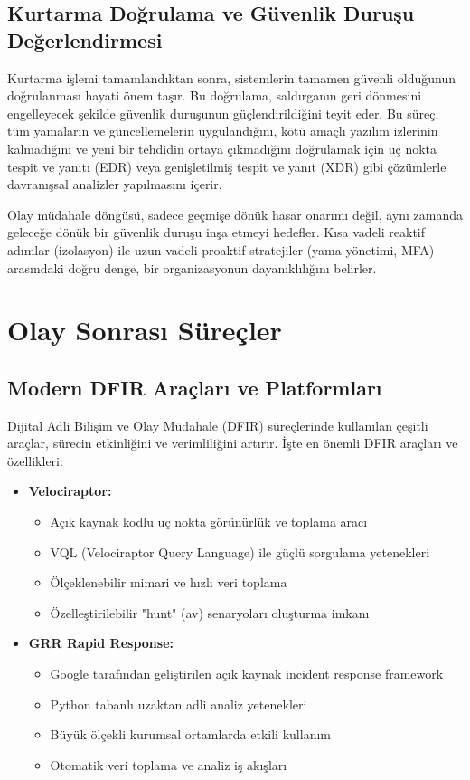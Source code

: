 \begin{itemize}
\subsection{Kurtarma Doğrulama ve Güvenlik Duruşu Değerlendirmesi}

Kurtarma işlemi tamamlandıktan sonra, sistemlerin tamamen güvenli olduğunun doğrulanması hayati önem taşır. Bu doğrulama, saldırganın geri dönmesini engelleyecek şekilde güvenlik duruşunun güçlendirildiğini teyit eder. Bu süreç, tüm yamaların ve güncellemelerin uygulandığını, kötü amaçlı yazılım izlerinin kalmadığını ve yeni bir tehdidin ortaya çıkmadığını doğrulamak için uç nokta tespit ve yanıtı (EDR) veya genişletilmiş tespit ve yanıt (XDR) gibi çözümlerle davranışsal analizler yapılmasını içerir.

Olay müdahale döngüsü, sadece geçmişe dönük hasar onarımı değil, aynı zamanda geleceğe dönük bir güvenlik duruşu inşa etmeyi hedefler. Kısa vadeli reaktif adımlar (izolasyon) ile uzun vadeli proaktif stratejiler (yama yönetimi, MFA) arasındaki doğru denge, bir organizasyonun dayanıklılığını belirler.

\section{Olay Sonrası Süreçler}

\subsection{Modern DFIR Araçları ve Platformları}

Dijital Adli Bilişim ve Olay Müdahale (DFIR) süreçlerinde kullanılan çeşitli araçlar, sürecin etkinliğini ve verimliliğini artırır. İşte en önemli DFIR araçları ve özellikleri:

\begin{itemize}
    \item \textbf{Velociraptor:}
    \begin{itemize}
        \item Açık kaynak kodlu uç nokta görünürlük ve toplama aracı
        \item VQL (Velociraptor Query Language) ile güçlü sorgulama yetenekleri
        \item Ölçeklenebilir mimari ve hızlı veri toplama
        \item Özelleştirilebilir "hunt" (av) senaryoları oluşturma imkanı
    \end{itemize}

    \item \textbf{GRR Rapid Response:}
    \begin{itemize}
        \item Google tarafından geliştirilen açık kaynak incident response framework
        \item Python tabanlı uzaktan adli analiz yetenekleri
        \item Büyük ölçekli kurumsal ortamlarda etkili kullanım
        \item Otomatik veri toplama ve analiz iş akışları
    \end{itemize}


\end{itemize}
\end{itemize}
